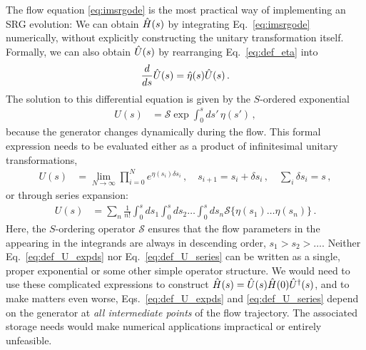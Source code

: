 The flow equation \eqref{eq:imsrgode} is the most practical way of implementing
an SRG evolution: We can obtain $\hat{H}(s)$ by integrating Eq.~\eqref{eq:imsrgode} 
numerically, without explicitly constructing the unitary transformation itself. 
Formally, we can also obtain $\hat{U}(s)$ by rearranging Eq.~\eqref{eq:def_eta} into
\begin{equation}\label{eq:Uflow}
  \totd{}{s}\UO(s) = \etaO(s)\UO(s)\,.
\end{equation}
The solution to this differential equation is given by the $S$-ordered 
exponential
\begin{align}
  U(s) &= \mathcal{S}\exp \int^s_0 ds'\,\eta(s') \label{eq:def_U_pathexp}\,,
\end{align}
because the generator changes dynamically during the flow. This formal expression 
needs to be evaluated either as a product of infinitesimal unitary transformations,
\begin{align}       \label{eq:def_U_expds}
   U(s) &= \lim_{N\to\infty}\prod^{N}_{i=0} e^{\eta(s_i)\delta s_i}\,,\quad s_{i+1}=s_i+\delta s_i\,,\quad \sum_{i}\delta s_i=s\,,
\end{align}
or through series expansion:
\begin{align}     \label{eq:def_U_series}
   U(s) &= \sum_n \frac{1}{n!}\int^s_0 ds_1 \int^s_0 ds_2 \ldots 
          \int^s_0 ds_n \mathcal{S}\{\eta(s_1)\ldots\eta(s_n)\}\,.
\end{align}
Here, the $S$-ordering operator $\mathcal{S}$ ensures that the flow parameters in the 
appearing in the integrands are always in descending order,
$s_1 > s_2 > \ldots$. Neither Eq.~\eqref{eq:def_U_expds} nor Eq.~\eqref{eq:def_U_series} 
can be written as a single, proper exponential or some other simple operator structure. 
We would need to use these complicated expressions to construct 
$\hat{H}(s)=\hat{U}(s)\hat{H}(0)\hat{U}^\dag(s)$, and to make matters even worse, Eqs.~\eqref{eq:def_U_expds}
and \eqref{eq:def_U_series} depend on the generator at \emph{all intermediate points} 
of the flow trajectory. The associated storage needs would make numerical applications
impractical or entirely unfeasible.

